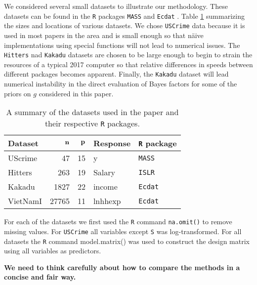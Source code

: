 \documentclass{article}[12pt]
\begin{document}
We considered several small datasets to illustrate our methodology. These datasets
can be found in the {\tt R} packages {\tt MASS} \citep{Venables2002} and 
{\tt Ecdat} \citep{Croissant2016}. Table \ref{tab:datasets} summarizing the sizes and 
locations of various datasets. We chose {\tt USCrime} data because it is used in most papers in
the area and is small enough so that n\"aive implementations using special functions will
not lead to numerical issues. The {\tt Hitters} nad {\tt Kakadu} datasets are chosen to
be large enough to begin to strain the resources of a typical 2017 computer so that
relative differences in speeds between different packages becomes apparent. Finally, the
{\tt Kakadu} dataset will lead numerical instability in the direct evaluation of Bayes
factors for some of the priors on $g$ considered in this paper.

\begin{table}[h]
	\begin{center}
\begin{tabular}{l|r|r|l|l}
{\bf Dataset}	& ${\bf n}$ & ${\bf p}$ & Response & {\bf {\tt R} package} \\ 
	\hline 
UScrime 	& 47 & 15 & y & {\tt MASS} \\  
Hitters	& 263 & 19 & Salary & {\tt ISLR} \\ 
Kakadu	& 1827 & 22 & income & {\tt Ecdat}   \\  
VietNamI	& 27765 & 11 & lnhhexp & {\tt Ecdat}  \\ 
\end{tabular} 
	\end{center}
\caption{A summary of the datasets used in the paper and their respective {\tt R} packages.}
\label{tab:datasets}
\end{table}
 
For each of the datasets we first used the {\tt R} command {\tt na.omit()} to remove missing values. For {\tt USCrime} all variables except {\tt S} was log-transformed. For all datasets
the {\tt R} command {model.matrix()} was used to construct the design matrix using all 
variables as predictors.

\bigskip 

{\bf We need to think carefully about how to compare the methods in a concise  and fair way.}
\end{document}
